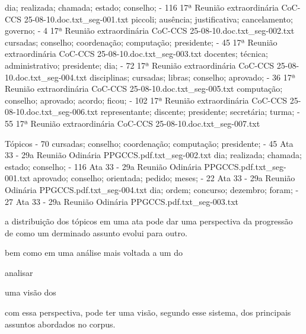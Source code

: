   dia; realizada; chamada; estado; conselho;  - 116 17ª Reunião extraordinária CoC-CCS 25-08-10.doc.txt_seg-001.txt 
  piccoli; ausência; justificativa; cancelamento; governo;  - 4 17ª Reunião extraordinária CoC-CCS 25-08-10.doc.txt_seg-002.txt 
  cursadas; conselho; coordenação; computação; presidente;  - 45 17ª Reunião extraordinária CoC-CCS 25-08-10.doc.txt_seg-003.txt 
  docentes; técnica; administrativo; presidente; dia;  - 72 17ª Reunião extraordinária CoC-CCS 25-08-10.doc.txt_seg-004.txt 
  disciplinas; cursadas; libras; conselho; aprovado;  - 36 17ª Reunião extraordinária CoC-CCS 25-08-10.doc.txt_seg-005.txt 
  computação; conselho; aprovado; acordo; ficou;  - 102 17ª Reunião extraordinária CoC-CCS 25-08-10.doc.txt_seg-006.txt 
  representante; discente; presidente; secretária; turma;  - 55 17ª Reunião extraordinária CoC-CCS 25-08-10.doc.txt_seg-007.txt 












Tópicos - 70 
  cursadas; conselho; coordenação; computação; presidente;  - 45 
    Ata 33 - 29a Reunião Odinária PPGCCS.pdf.txt_seg-002.txt 
  dia; realizada; chamada; estado; conselho;  - 116 
    Ata 33 - 29a Reunião Odinária PPGCCS.pdf.txt_seg-001.txt 
  aprovado; conselho; orientada; pedido; meses;  - 22 
    Ata 33 - 29a Reunião Odinária PPGCCS.pdf.txt_seg-004.txt 
  dia; ordem; concurso; dezembro; foram;  - 27 
    Ata 33 - 29a Reunião Odinária PPGCCS.pdf.txt_seg-003.txt 













a distribuição dos tópicos em uma ata pode dar uma perspectiva da progressão de 
como um derminado assunto evolui para outro.


bem como em uma análise mais voltada a um do

analisar


uma visão dos
















com essa perspectiva, pode ter uma visão, segundo esse sistema, dos principais assuntos abordados no corpus. 



